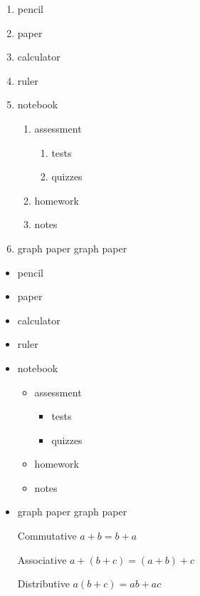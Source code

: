 \documentclass[11pt]{article}
\begin{document}
\begin{enumerate}
\item pencil
\item paper
\item calculator
\item ruler
\item notebook
	\begin{enumerate}
	\item assessment
		\begin{enumerate}
		\item tests
		\item quizzes
		\end{enumerate}
	\item homework
	\item notes
	\end{enumerate}
\item graph paper
graph paper
\end{enumerate}

\begin{itemize}
\item pencil
\item paper
\item calculator
\item ruler
\item notebook
	\begin{itemize}
	\item assessment
		\begin{itemize}
		\item tests
		\item quizzes
		\end{itemize}
	\item homework
	\item notes
	\end{itemize}
\item graph paper
graph paper
\end{itemize}

\begin{enumerate}
\item[Commutative] $a+b=b+a$
\item[Associative] $a+(b+c)=(a+b)+c$
\item[Distributive] $a(b+c)=ab+ac$
\end{enumerate}
\end{document}
